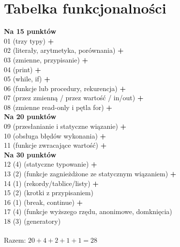 \documentclass[a4paper]{article}
\begin{document}
\section*{Tabelka funkcjonalności}
\textbf{Na 15 punktów}\\
\hspace*{0.3cm}01 (trzy typy) \hfill \textbf{+}\\
\hspace*{0.3cm}02 (literały, arytmetyka, porównania) \hfill \textbf{+}\\
\hspace*{0.3cm}03 (zmienne, przypisanie) \hfill \textbf{+}\\
\hspace*{0.3cm}04 (print) \hfill \textbf{+}\\
\hspace*{0.3cm}05 (while, if) \hfill \textbf{+}\\
\hspace*{0.3cm}06 (funkcje lub procedury, rekurencja) \hfill \textbf{+}\\
\hspace*{0.3cm}07 (przez zmienną / przez wartość / in/out) \hfill \textbf{+}\\
\hspace*{0.3cm}08 (zmienne read-only i pętla for) \hfill \textbf{+}\\
\textbf{Na 20 punktów}\\
\hspace*{0.3cm}09 (przesłanianie i statyczne wiązanie) \hfill \textbf{+}\\
\hspace*{0.3cm}10 (obsługa błędów wykonania) \hfill \textbf{+}\\
\hspace*{0.3cm}11 (funkcje zwracające wartość) \hfill \textbf{+}\\
\textbf{Na 30 punktów}\\
\hspace*{0.3cm}12 (4) (statyczne typowanie) \hfill \textbf{+}\\
\hspace*{0.3cm}13 (2) (funkcje zagnieżdżone ze statycznym wiązaniem) \hfill \textbf{+}\\
\hspace*{0.3cm}14 (1) (rekordy/tablice/listy) \hfill \textbf{+}\\
\hspace*{0.3cm}15 (2) (krotki z przypisaniem)\\
\hspace*{0.3cm}16 (1) (break, continue) \hfill \textbf{+}\\
\hspace*{0.3cm}17 (4) (funkcje wyższego rzędu, anonimowe, domknięcia)\\
\hspace*{0.3cm}18 (3) (generatory)\\\\
\noindent
Razem: $20 + 4 + 2 + 1 + 1 = 28$
\end{document}
